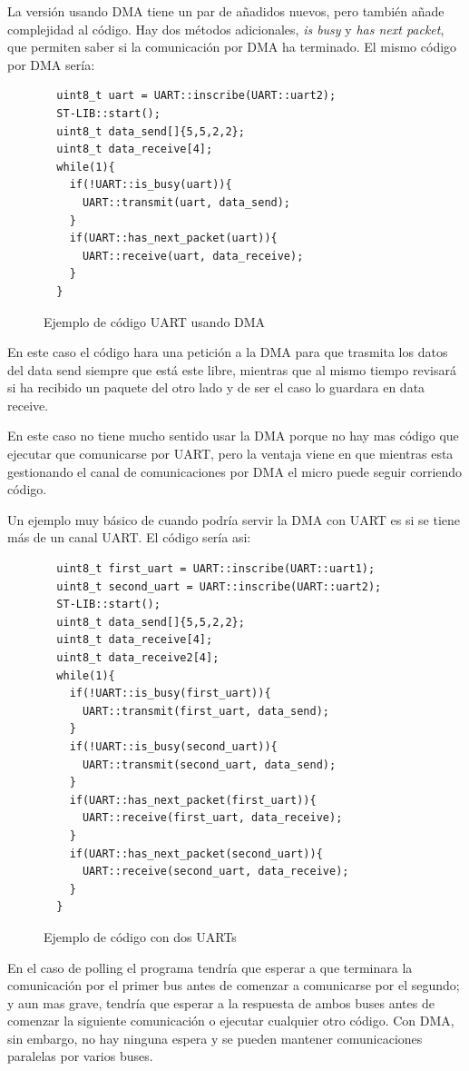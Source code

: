 \documentclass{report}
\begin{document}
\par \vspace{0.3cm}
La versión usando DMA tiene un par de añadidos nuevos, pero también añade complejidad al código. Hay dos métodos adicionales, \textit{is busy} y \textit{has next packet}, que permiten saber si la comunicación por DMA ha terminado. El mismo código por DMA sería: 
\begin{figure}[h]
\begin{lstlisting}
  uint8_t uart = UART::inscribe(UART::uart2);
  ST-LIB::start();
  uint8_t data_send[]{5,5,2,2};
  uint8_t data_receive[4];
  while(1){
    if(!UART::is_busy(uart)){
      UART::transmit(uart, data_send);
    }
    if(UART::has_next_packet(uart)){
      UART::receive(uart, data_receive);
    }
  }
\end{lstlisting}
\caption{Ejemplo de código UART usando DMA}
  \label{UARTwDMAcode}
\end{figure}
\par \vspace{0.3cm}

En este caso el código hara una petición a la DMA para que trasmita los datos del data send siempre que está este libre, mientras que al mismo tiempo revisará si ha recibido un paquete del otro lado y de ser el caso lo guardara en data receive. \par En este caso no tiene mucho sentido usar la DMA porque no hay mas código que ejecutar que comunicarse por UART, pero la ventaja viene en que mientras esta gestionando el canal de comunicaciones por DMA el micro puede seguir corriendo código. \par \vspace{0.3cm}
Un ejemplo muy básico de cuando podría servir la DMA con UART es si se tiene más de un canal UART. El código sería asi: 
\begin{figure}[h]
\begin{lstlisting}
  uint8_t first_uart = UART::inscribe(UART::uart1);
  uint8_t second_uart = UART::inscribe(UART::uart2);
  ST-LIB::start();
  uint8_t data_send[]{5,5,2,2};
  uint8_t data_receive[4];
  uint8_t data_receive2[4];
  while(1){
    if(!UART::is_busy(first_uart)){
      UART::transmit(first_uart, data_send);
    }
    if(!UART::is_busy(second_uart)){
      UART::transmit(second_uart, data_send);
    }
    if(UART::has_next_packet(first_uart)){
      UART::receive(first_uart, data_receive);
    }
    if(UART::has_next_packet(second_uart)){
      UART::receive(second_uart, data_receive);
    }
  }
\end{lstlisting}
\caption{Ejemplo de código con dos UARTs}
  \label{twoUARTcode}
\end{figure}
\par \vspace{0.3cm}
En el caso de polling el programa tendría que esperar a que terminara la comunicación por el primer bus antes de comenzar a comunicarse por el segundo; y aun mas grave, tendría que esperar a la respuesta de ambos buses antes de comenzar la siguiente comunicación o ejecutar cualquier otro código. Con DMA, sin embargo, no hay ninguna espera y se pueden mantener comunicaciones paralelas por varios buses. 
\end{document}
